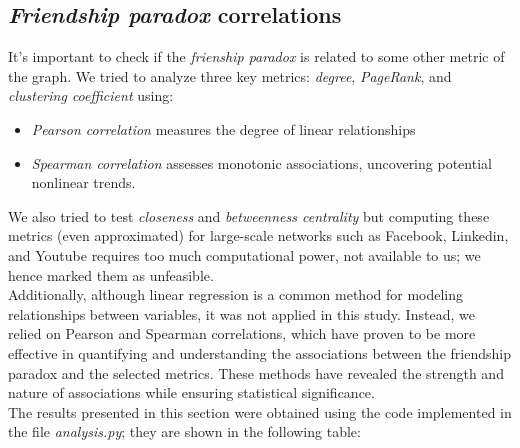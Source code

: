 \documentclass{article}
\begin{document}
\subsection{\textit{Friendship paradox} correlations}

It's important to check if the \textit{frienship paradox} is related to some other metric of the graph. We tried to analyze three key metrics: \textit{degree}, \textit{PageRank}, and \textit{clustering coefficient} using:
\begin{itemize}
    \item \textit{Pearson correlation} measures the degree of linear relationships
    \item \textit{Spearman correlation} assesses monotonic associations, uncovering potential nonlinear trends.
\end{itemize}
We also tried to test \textit{closeness} and \textit{betweenness centrality} but computing these metrics (even approximated) for large-scale networks such as Facebook, Linkedin, and Youtube requires too much computational power, not available to us; we hence marked them as unfeasible. \\
Additionally, although linear regression is a common method for modeling relationships between variables, it was not applied in this study.
Instead, we relied on Pearson and Spearman correlations, which have proven to be more effective in quantifying and understanding the associations between the friendship paradox and the selected metrics. These methods have revealed the strength and nature of associations while ensuring statistical significance. \\
The results presented in this section were obtained using the code implemented in the file \textit{analysis.py}; they are shown in the following table: \\
\end{document}
